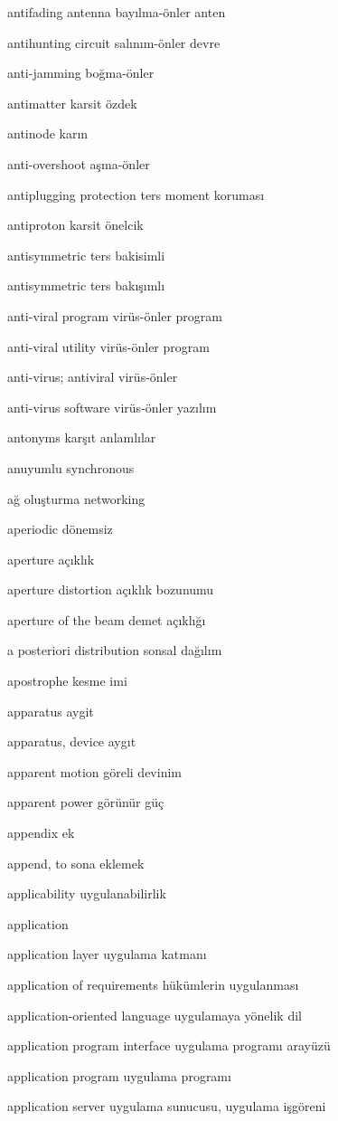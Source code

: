 \documentclass[12pt,fleqn]{article}\usepackage{../../common}
\begin{document}
antifading antenna bayılma-önler anten

antihunting circuit salınım-önler devre

anti-jamming boğma-önler

antimatter karsit özdek

antinode karın

anti-overshoot aşma-önler

antiplugging protection ters moment koruması

antiproton karsit önelcik

antisymmetric ters bakisimli

antisymmetric ters bakışımlı

anti-viral program virüs-önler program

anti-viral utility virüs-önler program

anti-virus; antiviral virüs-önler

anti-virus software virüs-önler yazılım

antonyms karşıt anlamlılar

anuyumlu synchronous

ağ oluşturma networking

aperiodic dönemsiz

aperture açıklık

aperture distortion açıklık bozunumu

aperture of the beam demet açıklığı

a posteriori distribution sonsal dağılım

apostrophe kesme imi

apparatus aygit

apparatus, device aygıt

apparent motion göreli devinim

apparent power görünür güç

appendix ek

append, to sona eklemek

applicability uygulanabilirlik

application

application layer uygulama katmanı

application of requirements hükümlerin uygulanması

application-oriented language uygulamaya yönelik dil

application program interface uygulama programı arayüzü

application program uygulama programı

application server uygulama sunucusu, uygulama işgöreni
\end{document}
